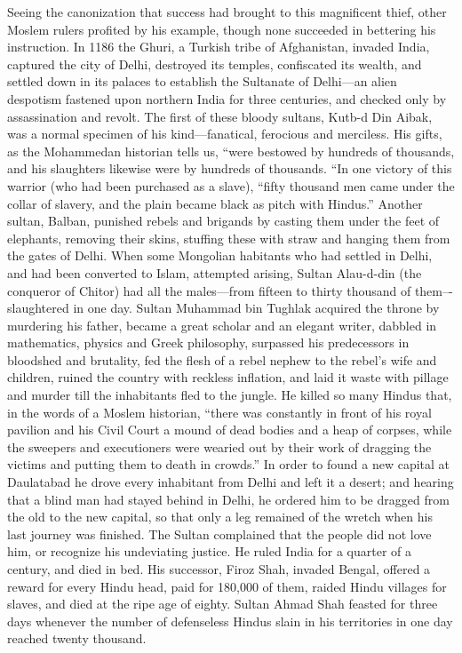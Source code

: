 Seeing the canonization that success had brought to this magnificent thief, other Moslem rulers profited by his example, though none succeeded in bettering his instruction. In 1186 the Ghuri, a Turkish tribe of Afghanistan, invaded India, captured the city of Delhi, destroyed its temples, confiscated its wealth, and settled down in its palaces to establish the Sultanate of Delhi—an alien despotism fastened upon northern India for three centuries, and checked only by assassination and revolt. The first of these bloody sultans, Kutb-d Din Aibak, was a normal specimen of his kind—fanatical, ferocious and merciless. His gifts, as the Mohammedan historian tells us, “were bestowed by hundreds of thousands, and his slaughters likewise were by hundreds of thousands. “In one victory of this warrior (who had been purchased as a slave), “fifty thousand men came under the collar of slavery, and the plain became black as pitch with Hindus.” Another sultan, Balban, punished rebels and brigands by casting them under the feet of elephants, removing their skins, stuffing these with straw and hanging them from the gates of Delhi. When some Mongolian habitants who had settled in Delhi, and had been converted to Islam, attempted arising, Sultan Alau-d-din (the conqueror of Chitor) had all the males—from fifteen to thirty thousand of them–-slaughtered in one day. Sultan Muhammad bin Tughlak acquired the throne by murdering his father, became a great scholar and an elegant writer, dabbled in mathematics, physics and Greek philosophy, surpassed his predecessors in bloodshed and brutality, fed the flesh of a rebel nephew to the rebel’s wife and children, ruined the country with reckless inflation, and laid it waste with pillage and murder till the inhabitants fled to the jungle. He killed so many Hindus that, in the words of a Moslem historian, “there was constantly in front of his royal pavilion and his Civil Court a mound of dead bodies and a heap of corpses, while the sweepers and executioners were wearied out by their work of dragging the victims and putting them to death in crowds.” In order to found a new capital at Daulatabad he drove every inhabitant from Delhi and left it a desert; and hearing that a blind man had stayed behind in Delhi, he ordered him to be dragged from the old to the new capital, so that only a leg remained of the wretch when his last journey was finished. The Sultan complained that the people did not love him, or recognize his undeviating justice. He ruled India for a quarter of a century, and died in bed. His successor, Firoz Shah, invaded Bengal, offered a reward for every Hindu head, paid for 180,000 of them, raided Hindu villages for slaves, and died at the ripe age of eighty. Sultan Ahmad Shah feasted for three days whenever the number of defenseless Hindus slain in his territories in one day reached twenty thousand.

